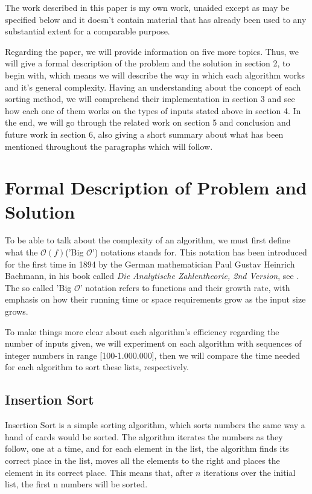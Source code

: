 \documentclass[]{article}
\begin{document}
The work described in this paper is my own work, unaided except as may be specified below and it doesn't contain material that has already been used to any substantial extent for a comparable purpose.

Regarding the paper, we will provide information on five more topics. Thus, we will give a formal description of the problem and the solution in section 2, to begin with, which means we will describe the way in which each algorithm works and it's general complexity. Having an understanding about the concept of each sorting method, we will comprehend their implementation in section 3 and see how each one of them works on the types of inputs stated above in section 4. In the end, we will go through the related work on section 5 and conclusion and future work in section 6, also giving a short summary about what has been mentioned throughout the paragraphs which will follow.
	
	\pagebreak
	
	\section{Formal Description of Problem and Solution}
To be able to talk about the complexity of an algorithm, we must first define what the $\mathcal{O}(f)$('Big $\mathcal{O}$') notations stands for. This notation has been introduced for the first time in 1894 by the German mathematician Paul Gustav Heinrich Bachmann, in his book called \textit{Die Analytische Zahlentheorie, 2nd Version}, see \cite{Bachmann:1894:Analytische}. The so called 'Big $\mathcal{O}$' notation refers to functions and their growth rate, with emphasis on how their running time or space requirements grow as the input size grows.

To make things more clear about each algorithm's efficiency regarding the number of inputs given, we will experiment on each algorithm with sequences of integer numbers in range [100-1.000.000], then we will compare the time needed for each algorithm to sort these lists, respectively.

	\subsection{Insertion Sort}
Insertion Sort is a simple sorting algorithm, which sorts numbers the same way a hand of cards would be sorted. The algorithm iterates the numbers as they follow, one at a time, and for each element in the list, the algorithm finds its correct place in the list, moves all the elements to the right and places the element in its correct place. This means that, after $n$ iterations over the initial list, the first n numbers will be sorted. 
\end{document}
